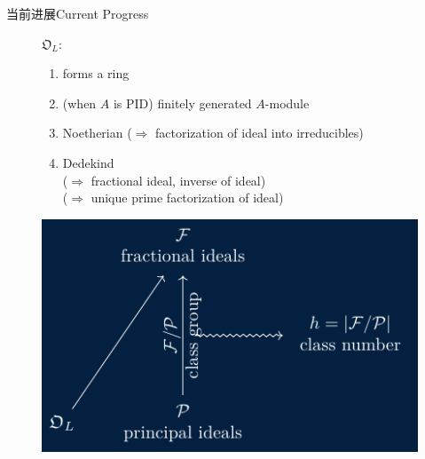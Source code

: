 \documentclass[aspectratio=169]{beamer}
\begin{document}
    \begin{frame}{当前进展}{Current Progress}
        \begin{figure}[htpb]
        \centering
        \begin{minipage}{0.49\linewidth}
            $\mathfrak{O}_L$:
            \begin{enumerate}
            \item forms a ring
            \item (when $A$ is PID) finitely generated $A$-module
            \item Noetherian ($\Rightarrow$ factorization of ideal into irreducibles)
            \item \textcolor{rgb,255:red,214;green,214;blue,92}{Dedekind 
            \\ ($\Rightarrow$ fractional ideal, inverse of ideal)
            \\ ($\Rightarrow$ unique prime factorization of ideal)}
            \end{enumerate}
        \end{minipage}
        \hfill
        \begin{minipage}{0.49\linewidth}
        \includegraphics{dia6.pdf}
        \end{minipage}
        \end{figure}
    \end{frame}
    
\end{document}
